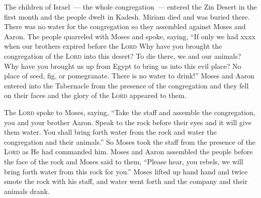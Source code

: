 
\begin{inparaenum}
   The children of Israel~--- the whole congregation~--- entered the Zin Desert in the first month and the people dwelt in Kadesh. Miriam died and was buried there.%
   There was no water for the congregation so they assembled against Moses and Aaron.%
   The people quarreled with Moses and spoke, saying, ``If only we had xxxx when our brothers expired before the \textsc{Lord}%
   Why have you brought the congregation of the \textsc{Lord} into this desert? To die there, we and our animals?%
   Why have you brought us up from Egypt to bring us into this evil place? No place of seed, fig, or pomegranate. There is no water to drink!''%
   Moses and Aaron entered into the Tabernacle from the presence of the congregation and they fell on their faces and the glory of the \textsc{Lord} appeared to them.%
  
   The \textsc{Lord} spoke to Moses, saying,%
   ``Take the staff and assemble the congregation, you and your brother Aaron. Speak to the rock before their eyes and it will give them water. You shall bring forth water from the rock and water the congregation and their animals.''%
   So Moses took the staff from the presence of the \textsc{Lord} as He had commanded him.%
   Moses and Aaron assembled the people before the face of the rock and Moses said to them, ``Please hear, you rebels, we will bring forth water from this rock for you.''%
   Moses lifted up hand hand and twice smote the rock with his staff, and water went forth and the company and their animals drank.%
  

\end{inparaenum}
